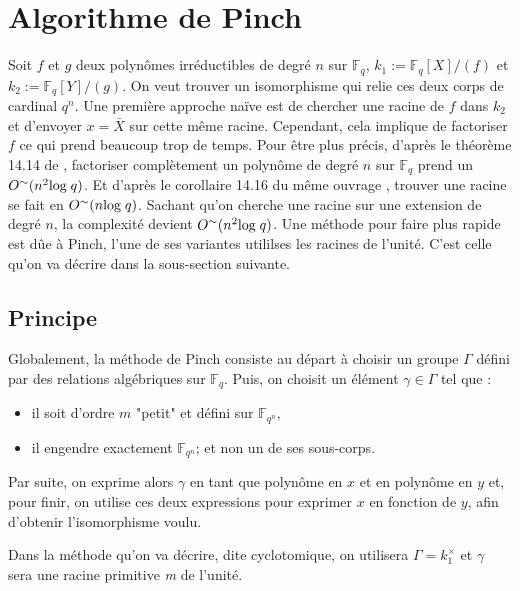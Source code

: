 \documentclass[a4paper]{article} %
\numberwithin{section}{part}
\numberwithin{equation}{section}
\newcommand\nroot[1]{\textit{#1}\up{\textit{ième}}}
\newcommand\GF[1]{\mathbb{F}_{#1}}
\begin{document}
\section{Algorithme de Pinch}
Soit $f$ et $g$ deux polynômes irréductibles de degré $n$ sur $\GF{q}$, 
$k_1 := \GF{q}[X]/(f)$ et $k_2 := \GF{q}[Y]/(g)$. On veut trouver un 
isomorphisme qui relie ces deux corps de cardinal $q^n$. Une première approche 
naïve est de chercher une racine de $f$ dans $k_2$ et d'envoyer $x = \bar{X}$
sur cette même racine. Cependant, cela implique de factoriser $f$ ce qui prend
beaucoup trop de temps. Pour être plus précis, d'après le théorème 14.14 de
\cite[p.~390]{GaGe}, factoriser complètement un polynôme de degré $n$ sur 
$\GF{q}$ prend un $O^{\sim}(n^2\textup{log\;}q)$. Et d'après le corollaire 14.16
du même ouvrage \cite[p.~392]{GaGe}, trouver une racine se fait en
$O^{\sim}(n\textup{log\;}q)$. Sachant qu'on cherche une racine sur une 
extension de degré $n$, la complexité devient $O^{\sim}(n^2\textup{log\;}q)$.
Une méthode pour faire plus rapide est dûe à Pinch, l'une de ses variantes
utililses les racines de l'unité. C'est celle qu'on va décrire dans la
sous-section suivante.

\subsection{Principe}
Globalement, la méthode de Pinch consiste au départ à choisir un groupe $\Gamma$
défini par des relations algébriques sur $\GF{q}$. Puis, on choisit un élément 
$\gamma\in\Gamma$ tel que :
\vspace{0.3cm}
\begin{itemize}
\item il soit d'ordre $m$ "petit" et défini sur $\GF{q^n}$,
\item il engendre exactement $\GF{q^n}$; et non un de ses sous-corps.
\end{itemize}
\vspace{0.3cm}
Par suite, on exprime alors $\gamma$ en tant que polynôme en $x$ et en
polynôme en $y$ et, pour finir, on utilise ces deux expressions pour exprimer 
$x$ en fonction de $y$, afin d'obtenir l'isomorphisme voulu.\par
Dans la méthode qu'on va décrire, dite cyclotomique, on utilisera $\Gamma =
k_1^{\times}$ et $\gamma$ sera une racine primitive \nroot{m} de l'unité.
\end{document}
